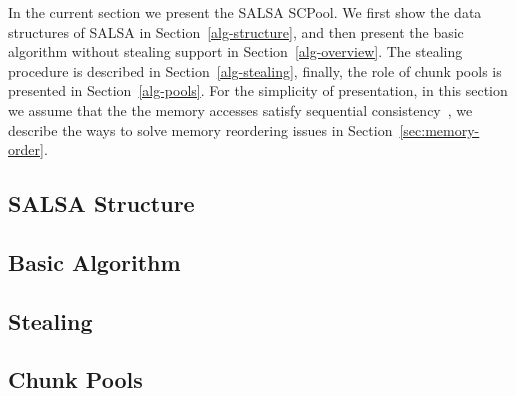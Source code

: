 In the current section we present the SALSA SCPool. We first show the data structures of SALSA in Section~\ref{alg-structure}, and then present the basic algorithm without stealing support in Section~\ref{alg-overview}. The stealing procedure is described in Section~\ref{alg-stealing}, finally, the role of chunk pools is presented in Section~\ref{alg-pools}. For the simplicity of presentation, in this section we assume that the the memory accesses satisfy sequential consistency~\cite{Lamport:SC}, we describe the ways to solve memory reordering issues in Section~\ref{sec:memory-order}. 
\subsection{SALSA Structure\label{alg-structure}}

\subsection{Basic Algorithm\label{alg-overview}}

\subsection{Stealing\label{alg-stealing}}

\subsection{Chunk Pools\label{alg-pools}}
